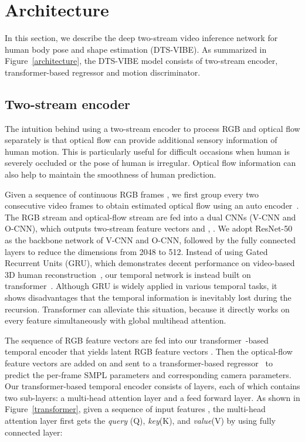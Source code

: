 \documentclass[10pt,twocolumn,letterpaper]{article}
\begin{document}
\section{Architecture}
In this section, we describe the deep two-stream video inference network for human body pose and shape estimation (DTS-VIBE). As summarized in Figure~\ref{architecture}, the DTS-VIBE model consists of two-stream encoder, transformer-based regressor and motion discriminator. 

\subsection{Two-stream encoder}

The intuition behind using a two-stream encoder to process RGB and optical flow separately is that optical flow can provide additional sensory information of human motion. This is particularly useful for difficult occasions when human is severely occluded or the pose of human is irregular. Optical flow information can also help to maintain the smoothness of human prediction.  

Given a sequence of continuous RGB frames , we first group every two consecutive video frames to obtain estimated optical flow  using an auto encoder~\cite{Liu_2019_CVPR}. The RGB stream  and optical-flow stream  are fed into a dual CNNs (V-CNN and O-CNN), which outputs two-stream feature vectors  and , . We adopt ResNet-50~\cite{christoph2016spatiotemporal} as the backbone network of V-CNN and O-CNN, followed by the fully connected layers to reduce the dimensions from 2048 to 512. Instead of using Gated Recurrent Units (GRU), which demonstrates decent performance on video-based 3D human reconstruction~\cite{kocabas2020vibe}, our temporal network is instead built on transformer~\cite{vaswani2017attention}. Although GRU is widely applied in various temporal tasks, it shows disadvantages that the temporal information is inevitably lost during the recursion. Transformer can alleviate this situation, because it directly works on every feature simultaneously with global multihead attention. 

The sequence of RGB feature vectors  are fed into our transformer~\cite{vaswani2017attention}-based temporal encoder that yields latent RGB feature vectors . Then the optical-flow feature vectors  are added on  and sent to a transformer-based regressor~\cite{kolotouros2019learning} to predict the per-frame SMPL parameters and corresponding camera parameters. 
Our transformer-based temporal encoder consists of  layers, each of which contains two sub-layers: a multi-head attention layer and a feed forward layer. As shown in Figure~\ref{transformer}, given a sequence of input features , the multi-head attention layer first gets the \textit{query} (Q), \textit{key}(K), and \textit{value}(V) by using fully connected layer:
\end{document}
